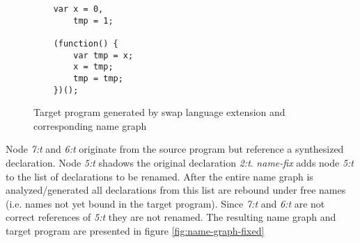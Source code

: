 \begin{figure}[h]
\centering
\begin{minipage}{0.25\linewidth}
\begin{lstlisting}
	var x = 0,
		tmp = 1;

	(function() {
		var tmp = x;
		x = tmp;
		tmp = tmp;
	})();
\end{lstlisting}
\end{minipage}
\hfill
\begin{minipage}{0.65\linewidth}
\end{minipage}

\caption{Target program generated by swap language extension and corresponding name graph} \label{fig:name-graph}
\end{figure}

Node \textit{7:t} and \textit{6:t} originate from the source program but reference a synthesized declaration. Node \textit{5:t} shadows the original declaration \textit{2:t}. \textit{name-fix} adds node \textit{5:t} to the list of declarations to be renamed. After the entire name graph is analyzed/generated all declarations from this list are rebound under free names (i.e. names not yet bound in the target program). Since \textit{7:t} and \textit{6:t} are not correct references of \textit{5:t} they are not renamed. The resulting name graph and target program are presented in figure \ref{fig:name-graph-fixed}


